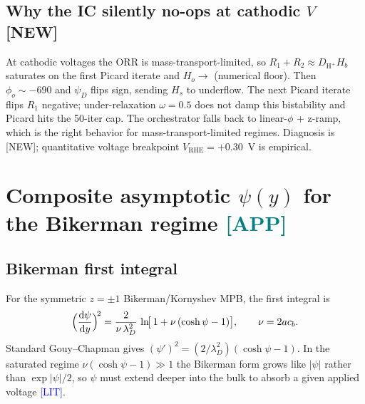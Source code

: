 \documentclass[11pt]{article}
\newcommand{\lit}{\textcolor{blue}{[LIT]}}
\newcommand{\app}{\textcolor{teal}{[APP]}}
\newcommand{\new}{\textcolor{red!70!black}{[NEW]}}
\newcommand{\diff}{\mathrm{d}}
\newcommand{\Hp}{\text{H}^+}
\begin{document}
\subsection{Why the IC silently no-ops at cathodic $V$ \new}
At cathodic voltages the ORR is mass-transport-limited, so
$R_1+R_2\approx D_{\Hp}H_b$ saturates on the first Picard iterate and
$H_o\to$ (numerical floor).  Then $\phi_o\sim-690$ and $\psi_D$ flips
sign, sending $H_s$ to underflow.  The next Picard iterate flips
$R_1$ negative; under-relaxation $\omega=0.5$ does not damp this
bistability and Picard hits the 50-iter cap.  The orchestrator falls
back to linear-$\phi$ + z-ramp, which is the right behavior for
mass-transport-limited regimes.  Diagnosis is \new{}; quantitative
voltage breakpoint $V_{\mathrm{RHE}}=+0.30$~V is empirical.

\section{Composite asymptotic $\psi(y)$ for the Bikerman regime \app}
\label{sec:option2b}

\subsection{Bikerman first integral}
For the symmetric $z=\pm 1$ Bikerman/Kornyshev MPB, the first
integral is
\cite{borukhov1997,bazant2009}
\begin{equation}
  \Bigl(\frac{\diff\psi}{\diff y}\Bigr)^{\!2}
   = \frac{2}{\nu\,\lambda_D^2}\,
     \ln\!\bigl[\,1 + \nu\,(\cosh\psi-1)\bigr],
   \qquad \nu = 2 a c_b.
  \label{eq:Bik-first-int}
\end{equation}
Standard Gouy--Chapman gives
$(\psi')^2 = (2/\lambda_D^2)(\cosh\psi-1)$.  In the saturated regime
$\nu(\cosh\psi-1)\gg 1$ the Bikerman form grows like $|\psi|$ rather
than $\exp|\psi|/2$, so $\psi$ must extend deeper into the bulk to
absorb a given applied voltage \lit{}.
\end{document}
